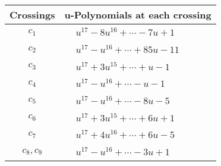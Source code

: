 \documentclass[1p]{elsarticle_modified}
\theoremstyle{definition}
\begin{document}
\begin{tabular}{m{50pt}|m{274pt}}
Crossings & \hspace{64pt}u-Polynomials at each crossing \\
\hline $$\begin{aligned}c_{1}\end{aligned}$$&$\begin{aligned}
&u^{17}-8 u^{16}+\cdots-7 u+1
\end{aligned}$\\
\hline $$\begin{aligned}c_{2}\end{aligned}$$&$\begin{aligned}
&u^{17}- u^{16}+\cdots+85 u-11
\end{aligned}$\\
\hline $$\begin{aligned}c_{3}\end{aligned}$$&$\begin{aligned}
&u^{17}+3 u^{15}+\cdots+u-1
\end{aligned}$\\
\hline $$\begin{aligned}c_{4}\end{aligned}$$&$\begin{aligned}
&u^{17}- u^{16}+\cdots- u-1
\end{aligned}$\\
\hline $$\begin{aligned}c_{5}\end{aligned}$$&$\begin{aligned}
&u^{17}- u^{16}+\cdots-8 u-5
\end{aligned}$\\
\hline $$\begin{aligned}c_{6}\end{aligned}$$&$\begin{aligned}
&u^{17}+3 u^{15}+\cdots+6 u+1
\end{aligned}$\\
\hline $$\begin{aligned}c_{7}\end{aligned}$$&$\begin{aligned}
&u^{17}+4 u^{16}+\cdots+6 u-5
\end{aligned}$\\
\hline $$\begin{aligned}c_{8},c_{9}\end{aligned}$$&$\begin{aligned}
&u^{17}- u^{16}+\cdots-3 u+1
\end{aligned}$\\

\end{tabular}
\end{document}
